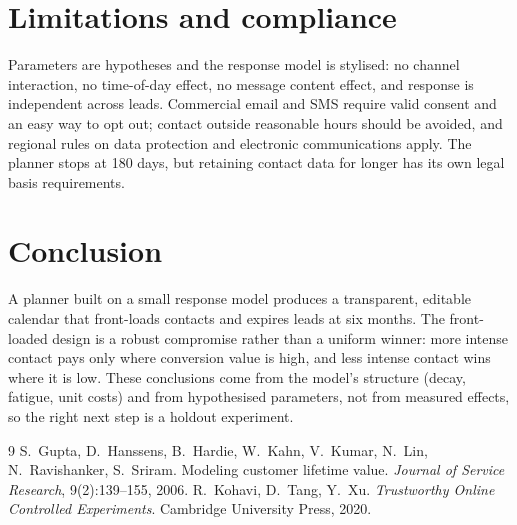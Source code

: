 \documentclass[10pt,a4paper]{article}
\begin{document}
\section{Limitations and compliance}
Parameters are hypotheses and the response model is stylised: no channel interaction, no time-of-day effect, no message content effect, and response is independent across leads. Commercial email and SMS require valid consent and an easy way to opt out; contact outside reasonable hours should be avoided, and regional rules on data protection and electronic communications apply. The planner stops at 180 days, but retaining contact data for longer has its own legal basis requirements.

\section{Conclusion}
A planner built on a small response model produces a transparent, editable calendar that front-loads contacts and expires leads at six months. The front-loaded design is a robust compromise rather than a uniform winner: more intense contact pays only where conversion value is high, and less intense contact wins where it is low. These conclusions come from the model's structure (decay, fatigue, unit costs) and from hypothesised parameters, not from measured effects, so the right next step is a holdout experiment.

\begin{thebibliography}{9}
 S.~Gupta, D.~Hanssens, B.~Hardie, W.~Kahn, V.~Kumar, N.~Lin, N.~Ravishanker, S.~Sriram. Modeling customer lifetime value. \emph{Journal of Service Research}, 9(2):139--155, 2006.
 R.~Kohavi, D.~Tang, Y.~Xu. \emph{Trustworthy Online Controlled Experiments}. Cambridge University Press, 2020.
\end{thebibliography}
\end{document}
